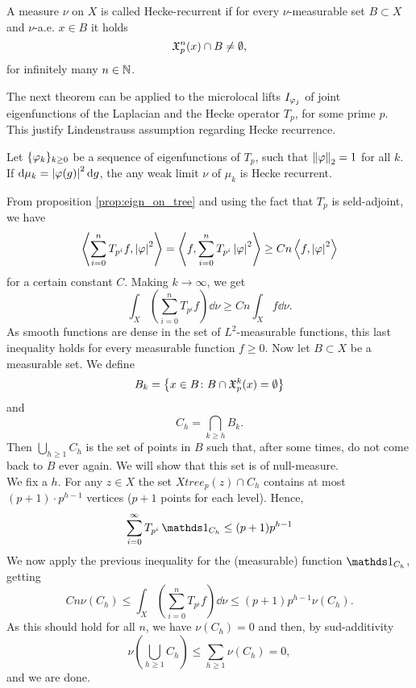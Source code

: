 \begin{defin}
A measure $\nu$ on $X$ is called Hecke-recurrent if for every $\nu$-measurable set $B\subset X$ and $\nu$-a.e. $x\in B$ it holds
\[
\mathfrak{X}_{p}^{n}(x)\cap B\neq \emptyset,
\]
for infinitely many $n\in\mathbb{N}$.
\end{defin}

The next theorem can be applied to the microlocal lifts $I_{\varphi_{j}}$ of joint eigenfunctions of the Laplacian and the Hecke operator $T_{p}$, for some prime $p$. This justify Lindenstrauss assumption regarding Hecke recurrence.

\begin{nteo}
\label{teo:Hecke_recurrence}
Let $\{\varphi_{k}\}_{k\geq0}$ be a sequence of eigenfunctions of $T_{p}$, such that $\left\lVert \varphi\right\rVert_{2}=1$ for all $k$. If $\mathop{}\!\mathrm{d}\mu_{k}=\left| \varphi(g)\right|^{2}\mathop{}\!\mathrm{d} g$, the any weak limit $\nu$ of $\mu_{k}$ is Hecke recurrent. 
\end{nteo}
\begin{prf}
From proposition \ref{prop:eign_on_tree} and using the fact that $T_{p}$ is seld-adjoint, we have
\[
\left< \sum_{i=0}^{n}T_{p^{i}}f,\left| \varphi\right|^{2}\right>=\left< f,\sum_{i=0}^{n}T_{p^{i}}\left| \varphi\right|^{2}\right>\geq Cn\left< f,\left| \varphi\right|^{2}\right>
\]
for a certain constant $C$. Making $k\to\infty$, we get
\[
\int_{X}\left(\sum_{i=0}^{n}T_{p^{i}}f\right)\dd\nu\geq Cn\int_{X}f\dd\nu.
\]
As smooth functions are dense in the set of $L^{2}$-measurable functions, this last inequality holds for every measurable function $f\geq0$. Now let $B\subset X$ be a measurable set. We define 
\[
B_{k}=\left\{
x\in B\colon B\cap\mathfrak{X}_{p}^{k}(x)=\emptyset
\right\}
\]
and
\[
C_{h}=\bigcap_{k\geq h}B_{k}.
\]
Then $\bigcup_{h\geq1}C_{h}$ is the set of points in $B$ such that, after some times, do not come back to $B$ ever again. We will show that this set is of null-measure.\\
We fix a $h$. For any $z\in X$ the set $Xtree_{p}(z)\cap C_{h}$ contains at most $(p+1)\cdot p^{h-1}$ vertices ($p+1$ points for each level). Hence,
\[
\sum_{i=0}^{\infty}T_{p^{i}}\one_{C_{h}}\leq(p+1)p^{h-1}
\]
We now apply the previous inequality for the (measurable) function $\one_{C_{h}}$, getting
\[
C n \nu(C_{h})\leq \int_{X}\left(\sum_{i=0}^{n}T_{p^{i}}f\right)\dd\nu\leq (p+1)p^{h-1}\nu(C_{h}).
\]
As this should hold for all $n$, we have $\nu(C_{h})=0$ and then, by sud-additivity
\[
\nu\left(\bigcup_{h\geq1}C_{h}\right)\leq \sum_{h\geq1}\nu(C_{h})=0,
\]
and we are done.
\end{prf}

